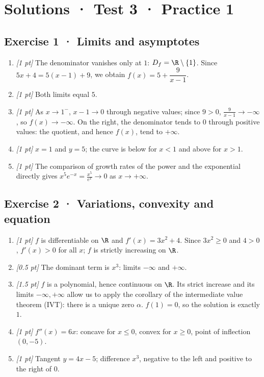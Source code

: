 \ifprof\clearpage

\section*{Solutions · Test 3 · Practice 1}\label{cor:4-1}

\subsection*{Exercise 1 · Limits and asymptotes}\begin{enumerate}

\item \textit{[1 pt]} The denominator vanishes only at $1$: $D_f=\R\setminus\{1\}$. Since $5x+4=5(x-1)+9$, we obtain $f(x)=5+\dfrac{9}{x-1}$.

\item \textit{[1 pt]} Both limits equal $5$.

\item \textit{[1 pt]} As $x\to 1^-$, $x-1\to0$ through negative values; since $9>0$, $\frac{9}{x-1}\to-\infty$, so $f(x)\to-\infty$. On the right, the denominator tends to $0$ through positive values: the quotient, and hence $f(x)$, tend to $+\infty$.

\item \textit{[1 pt]} $x=1$ and $y=5$; the curve is below for $x<1$ and above for $x>1$.

\item \textit{[1 pt]} The comparison of growth rates of the power and the exponential directly gives $x^5e^{-x}=\frac{x^5}{e^x}\to0$ as $x\to+\infty$.

\end{enumerate}

\subsection*{Exercise 2 · Variations, convexity and equation}\begin{enumerate}

\item \textit{[1 pt]} $f$ is differentiable on $\R$ and $f'(x)=3x^2+4$. Since $3x^2\ge0$ and $4>0$, $f'(x)>0$ for all $x$; $f$ is strictly increasing on $\R$.

\item \textit{[0.5 pt]} The dominant term is $x^3$: limits $-\infty$ and $+\infty$.

\item \textit{[1.5 pt]} $f$ is a polynomial, hence continuous on $\R$. Its strict increase and its limits $-\infty,+\infty$ allow us to apply the corollary of the intermediate value theorem (IVT): there is a unique zero $\alpha$. $f(1)=0$, so the solution is exactly $1$.

\item \textit{[1 pt]} $f''(x)=6x$: concave for $x\le0$, convex for $x\ge0$, point of inflection $(0,-5)$.

\item \textit{[1 pt]} Tangent $y=4x-5$; difference $x^3$, negative to the left and positive to the right of $0$.

\end{enumerate}

